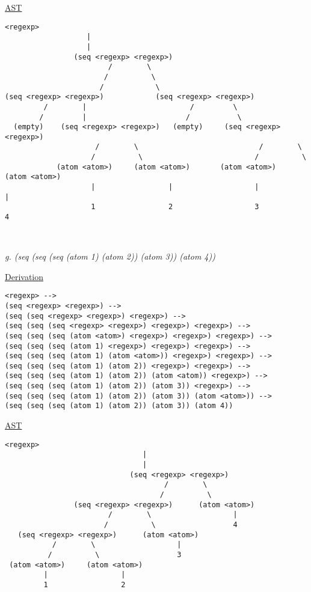 \documentclass{article}
\begin{document}
\underline{AST}
\begin{lstlisting}[language=vasu]
                <regexp>
                   |
                   |
                (seq <regexp> <regexp>)
                        /        \
                       /          \
                      /            \
(seq <regexp> <regexp>)            (seq <regexp> <regexp>)
         /        |                        /         \
        /         |                       /           \
  (empty)    (seq <regexp> <regexp>)   (empty)     (seq <regexp> <regexp>)
                     /        \                            /        \
                    /          \                          /          \
            (atom <atom>)     (atom <atom>)       (atom <atom>)     (atom <atom>)
                    |                 |                   |                 |
                    1                 2                   3                 4
      
      
\end{lstlisting}

\begin{quoting}
\textit{g. (seq (seq (seq (atom 1) (atom 2)) (atom 3)) (atom 4))}
\end{quoting}

\underline{Derivation}
\begin{lstlisting}[language=vasu]
<regexp> --> 
(seq <regexp> <regexp>) -->
(seq (seq <regexp> <regexp>) <regexp>) -->
(seq (seq (seq <regexp> <regexp>) <regexp>) <regexp>) -->
(seq (seq (seq (atom <atom>) <regexp>) <regexp>) <regexp>) -->
(seq (seq (seq (atom 1) <regexp>) <regexp>) <regexp>) -->
(seq (seq (seq (atom 1) (atom <atom>)) <regexp>) <regexp>) -->
(seq (seq (seq (atom 1) (atom 2)) <regexp>) <regexp>) -->
(seq (seq (seq (atom 1) (atom 2)) (atom <atom)) <regexp>) -->
(seq (seq (seq (atom 1) (atom 2)) (atom 3)) <regexp>) -->
(seq (seq (seq (atom 1) (atom 2)) (atom 3)) (atom <atom>)) -->
(seq (seq (seq (atom 1) (atom 2)) (atom 3)) (atom 4))

\end{lstlisting}

\underline{AST}
\begin{lstlisting}[language=vasu]
                            <regexp>
                                |
                                |
                             (seq <regexp> <regexp>)
                                     /        \
                                    /          \
                (seq <regexp> <regexp>)      (atom <atom>)
                        /        \                   |
                       /          \                  4
   (seq <regexp> <regexp>)      (atom <atom>)
           /        \                   |
          /          \                  3
 (atom <atom>)     (atom <atom>)
         |                 |
         1                 2
      
      
\end{lstlisting}
\newpage
\end{document}
